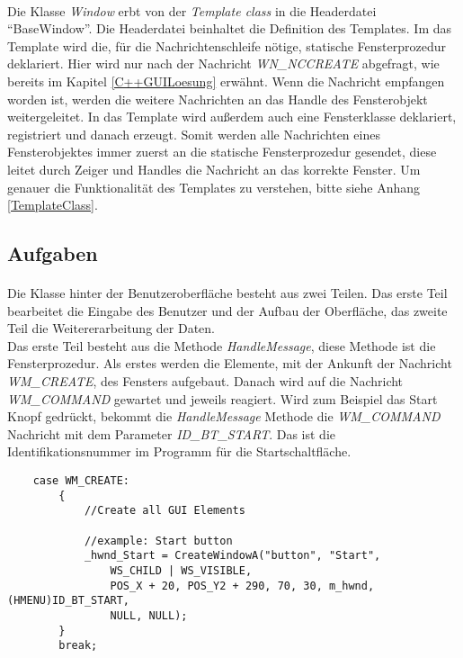 \paragraph{}
Die Klasse \textit{Window} erbt von der \textit{Template class} in die Headerdatei "`BaseWindow"'. Die Headerdatei beinhaltet die Definition des Templates. Im das Template wird die, für die Nachrichtenschleife nötige, statische Fensterprozedur deklariert. Hier wird nur nach der Nachricht \textit{WN\_NCCREATE} abgefragt, wie bereits im Kapitel \ref{C++GUILoesung} erwähnt. Wenn die Nachricht empfangen worden ist, werden die weitere Nachrichten an das Handle des Fensterobjekt weitergeleitet. In das Template wird außerdem auch eine Fensterklasse deklariert, registriert und danach erzeugt. Somit werden alle Nachrichten eines Fensterobjektes immer zuerst an die statische Fensterprozedur gesendet, diese leitet durch Zeiger und Handles die Nachricht an das korrekte Fenster. Um genauer die Funktionalität des Templates zu verstehen, bitte siehe Anhang \ref{TemplateClass}.

\subsection{Aufgaben}
\paragraph{}
Die Klasse hinter der Benutzeroberfläche besteht aus zwei Teilen. Das erste Teil bearbeitet die Eingabe des Benutzer und der Aufbau der Oberfläche, das zweite Teil die Weitererarbeitung der Daten.\\

Das erste Teil besteht aus die Methode \textit{HandleMessage}, diese Methode ist die Fensterprozedur. Als erstes werden die Elemente, mit der Ankunft der Nachricht \textit{WM\_CREATE}, des Fensters aufgebaut. Danach wird auf die Nachricht \textit{WM\_COMMAND} gewartet und jeweils reagiert. Wird zum Beispiel das Start Knopf gedrückt, bekommt die \textit{HandleMessage} Methode die \textit{WM\_COMMAND} Nachricht mit dem Parameter \textit{ID\_BT\_START}. Das ist die Identifikationsnummer im Programm für die Startschaltfläche.\\

\begin{lstlisting}	 
    case WM_CREATE:
        {
            //Create all GUI Elements
            
            //example: Start button
            _hwnd_Start = CreateWindowA("button", "Start",
				WS_CHILD | WS_VISIBLE,
				POS_X + 20, POS_Y2 + 290, 70, 30, m_hwnd, (HMENU)ID_BT_START,
				NULL, NULL);
        }
        break;
\end{lstlisting}

